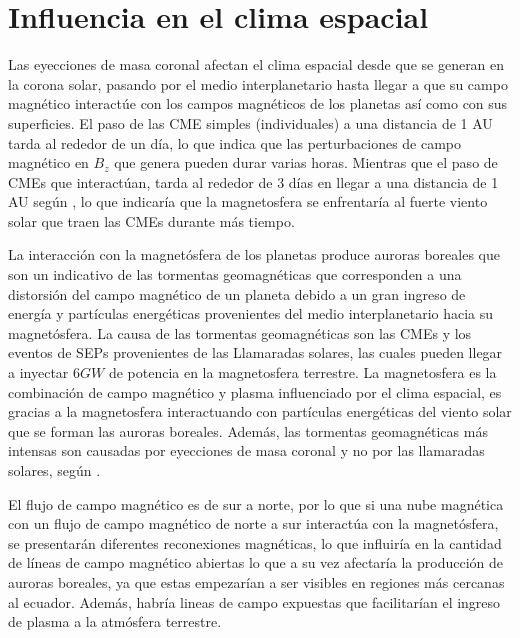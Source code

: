 \section{Influencia en el clima espacial}
Las eyecciones de masa coronal afectan el clima espacial desde que se generan en la corona solar, pasando por el medio interplanetario hasta llegar a que su campo magnético interactúe con los campos magnéticos de los planetas así como con sus superficies. El paso de las \ac{CME} simples (individuales) a una distancia de 1 AU  tarda al rededor de un día, lo que indica que las perturbaciones de campo magnético en $B_z$ que genera pueden durar varias horas. Mientras que el paso de \acp{CME} que interactúan, tarda al rededor de 3 días en llegar a una distancia de 1 AU según \cite[e.g.,][]{lugaz-2017}, lo que indicaría que la magnetosfera se enfrentaría al fuerte viento solar que traen las \acp{CME} durante más tiempo.

La interacción con la magnetósfera de los planetas produce auroras boreales que son un indicativo de las tormentas geomagnéticas que corresponden a una distorsión del campo magnético de un planeta debido a un gran ingreso de energía y partículas energéticas provenientes del medio interplanetario hacia su magnetósfera. La causa de las tormentas geomagnéticas son las \acp{CME} y los eventos de SEPs provenientes de las Llamaradas solares, las cuales pueden llegar a inyectar 6$GW$ de potencia en la magnetosfera terrestre. La magnetosfera es la combinación de campo magnético y plasma influenciado por el clima espacial, es gracias a la magnetosfera interactuando con partículas energéticas del viento solar que se forman las auroras boreales. Además, las tormentas geomagnéticas más intensas son causadas por eyecciones de masa coronal y no por las llamaradas solares, según \cite[e.g,][]{2014swcm.book.....H}.

El flujo de campo magnético es de sur a norte, por lo que si una nube magnética con un flujo de campo magnético de norte a sur interactúa con la magnetósfera, se presentarán diferentes reconexiones magnéticas, lo que influiría en la cantidad de líneas de campo magnético abiertas lo que a su vez afectaría la producción de auroras boreales, ya que estas empezarían a ser visibles en regiones más cercanas al ecuador. Además, habría lineas de campo expuestas que facilitarían el ingreso de plasma a la atmósfera terrestre.


